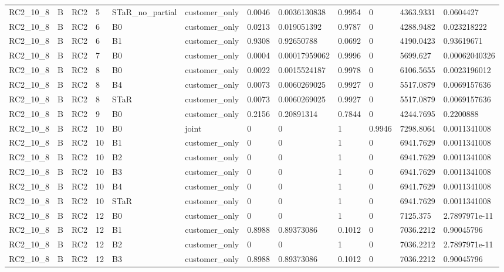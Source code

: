 \begin{longtable}{llllllllllll}
RC2\_10\_8 & B & RC2 & 5 & STaR\_no\_partial & customer\_only & 0.0046 & 0.0036130838 & 0.9954 & 0 & 4363.9331 & 0.0604427 \\
RC2\_10\_8 & B & RC2 & 6 & B0 & customer\_only & 0.0213 & 0.019051392 & 0.9787 & 0 & 4288.9482 & 0.023218222 \\
RC2\_10\_8 & B & RC2 & 6 & B1 & customer\_only & 0.9308 & 0.92650788 & 0.0692 & 0 & 4190.0423 & 0.93619671 \\
RC2\_10\_8 & B & RC2 & 7 & B0 & customer\_only & 0.0004 & 0.00017959062 & 0.9996 & 0 & 5699.627 & 0.00062040326 \\
RC2\_10\_8 & B & RC2 & 8 & B0 & customer\_only & 0.0022 & 0.0015524187 & 0.9978 & 0 & 6106.5655 & 0.0023196012 \\
RC2\_10\_8 & B & RC2 & 8 & B4 & customer\_only & 0.0073 & 0.0060269025 & 0.9927 & 0 & 5517.0879 & 0.0069157636 \\
RC2\_10\_8 & B & RC2 & 8 & STaR & customer\_only & 0.0073 & 0.0060269025 & 0.9927 & 0 & 5517.0879 & 0.0069157636 \\
RC2\_10\_8 & B & RC2 & 9 & B0 & customer\_only & 0.2156 & 0.20891314 & 0.7844 & 0 & 4244.7695 & 0.2200888 \\
RC2\_10\_8 & B & RC2 & 10 & B0 & joint & 0 & 0 & 1 & 0.9946 & 7298.8064 & 0.0011341008 \\
RC2\_10\_8 & B & RC2 & 10 & B1 & customer\_only & 0 & 0 & 1 & 0 & 6941.7629 & 0.0011341008 \\
RC2\_10\_8 & B & RC2 & 10 & B2 & customer\_only & 0 & 0 & 1 & 0 & 6941.7629 & 0.0011341008 \\
RC2\_10\_8 & B & RC2 & 10 & B3 & customer\_only & 0 & 0 & 1 & 0 & 6941.7629 & 0.0011341008 \\
RC2\_10\_8 & B & RC2 & 10 & B4 & customer\_only & 0 & 0 & 1 & 0 & 6941.7629 & 0.0011341008 \\
RC2\_10\_8 & B & RC2 & 10 & STaR & customer\_only & 0 & 0 & 1 & 0 & 6941.7629 & 0.0011341008 \\
RC2\_10\_8 & B & RC2 & 12 & B0 & customer\_only & 0 & 0 & 1 & 0 & 7125.375 & 2.7897971e-11 \\
RC2\_10\_8 & B & RC2 & 12 & B1 & customer\_only & 0.8988 & 0.89373086 & 0.1012 & 0 & 7036.2212 & 0.90045796 \\
RC2\_10\_8 & B & RC2 & 12 & B2 & customer\_only & 0 & 0 & 1 & 0 & 7036.2212 & 2.7897971e-11 \\
RC2\_10\_8 & B & RC2 & 12 & B3 & customer\_only & 0.8988 & 0.89373086 & 0.1012 & 0 & 7036.2212 & 0.90045796 \\

\end{longtable}
